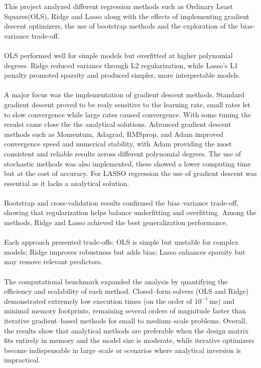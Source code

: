 \documentclass[
 reprint,            %
 amsmath,amssymb,
 aps,
]{revtex4-2}
\begin{document}
\label{sec:Discussion_and_Conclusion}
This project analyzed different regression methods such as Ordinary Least Squares(OLS),
Ridge and Lasso along with the effects of implementing gradient descent optimizers,
the use of bootstrap methods and the exploration of the bias-variance trade-off.\\\\
OLS performed well for simple models but overfitted at higher polynomial degrees.
Ridge reduced variance through L2 regularization, while Lasso’s L1 penalty promoted sparsity and produced simpler, more interpretable models.\\\\
A major focus was the implementation of gradient descent methods.
Standard gradient descent proved to be realy sensitive to the learning rate, small rates let to slow convergence while large rates caused convergence.
With some tuning the resulst came close the the analytical solutions.
Advanced gradient descent methods such as Momentum, Adagrad, RMSprop, and Adam improved convergence speed and numerical stability, with Adam providing the most consistent and reliable results across different polynomial degrees.
The use of stochastic methods was also implemented, these showed a lower computing time but at the cost of accuracy.
For LASSO regression the use of gradient descent was essential as it lacks a analytical solution.\\\\
Bootstrap and cross-validation results confirmed the bias–variance trade-off, showing that regularization helps balance underfitting and overfitting.
Among the methods, Ridge and Lasso achieved the best generalization performance.\\\\
Each approach presented trade-offs:
OLS is simple but unstable for complex models;
Ridge improves robustness but adds bias;
Lasso enhances sparsity but may remove relevant predictors.\\\\
The computational benchmark expanded the analysis by quantifying the efficiency and scalability of each method.  
Closed–form solvers (OLS and Ridge) demonstrated extremely low execution times (on the order of $10^{-1}$\,ms) and minimal memory footprints, remaining several orders of magnitude faster than iterative gradient–based methods for small to medium–scale problems.   
Overall, the results show that analytical methods are preferable when the design matrix fits entirely in memory and the model size is moderate, while iterative optimizers become indispensable in large–scale or scenarios where analytical inversion is impractical.  
\end{document}
